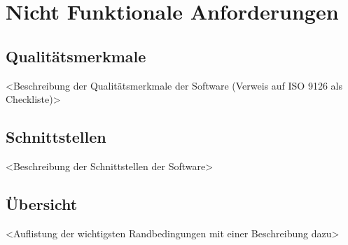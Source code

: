 \chapter{Nicht Funktionale Anforderungen}
	\section{Qualitätsmerkmale}
	<Beschreibung der Qualitätsmerkmale der Software (Verweis auf ISO 9126 als Checkliste)>
	
	\section{Schnittstellen}
	<Beschreibung der Schnittstellen der Software>
	
	\section{Übersicht}
	<Auflistung der wichtigsten Randbedingungen mit einer Beschreibung dazu>